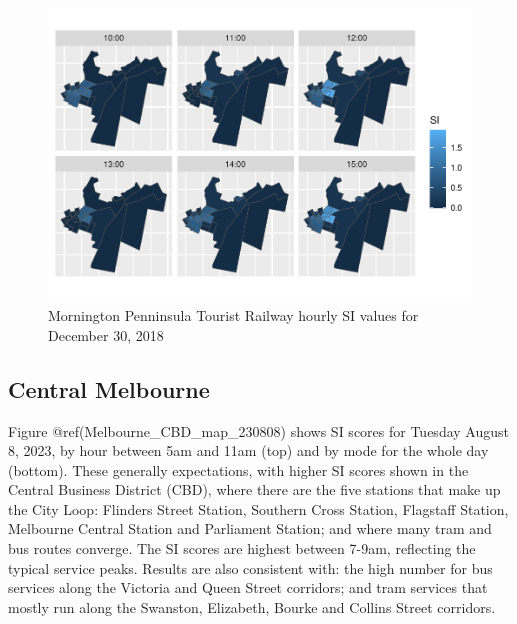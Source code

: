 \documentclass[preprint, 3p,
authoryear]{elsarticle} %
\begin{document}
\begin{figure}
\centering
\includegraphics{Leveraging_GTFS_to_assess_transit_supply_Transport_Geography_files/figure-latex/SI_mornington_20181230_output-1.pdf}
\caption{Mornington Penninsula Tourist Railway hourly SI values for
December 30, 2018}
\end{figure}

\hypertarget{central-melbourne}{%
\subsection{Central Melbourne}\label{central-melbourne}}

Figure @ref(Melbourne\_CBD\_map\_230808) shows SI scores for Tuesday
August 8, 2023, by hour between 5am and 11am (top) and by mode for the
whole day (bottom). These generally expectations, with higher SI scores
shown in the Central Business District (CBD), where there are the five
stations that make up the City Loop: Flinders Street Station, Southern
Cross Station, Flagstaff Station, Melbourne Central Station and
Parliament Station; and where many tram and bus routes converge. The SI
scores are highest between 7-9am, reflecting the typical service peaks.
Results are also consistent with: the high number for bus services along
the Victoria and Queen Street corridors; and tram services that mostly
run along the Swanston, Elizabeth, Bourke and Collins Street corridors.
\end{document}
